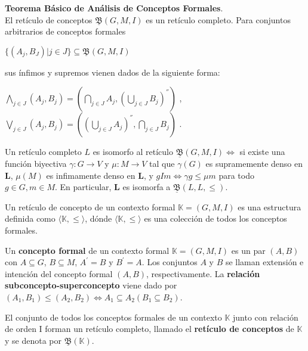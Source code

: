 \documentclass[../../main.tex]{subfiles}
\begin{document}
\begin{teorema}
\textbf{Teorema Básico de Análisis de Conceptos Formales}. \\
El retículo de conceptos $\underline{\mathfrak{B}}(G, M, I)$ es un retículo completo. Para conjuntos arbitrarios de conceptos formales
\begin{center}
    $\{ (A_j, B_J) | j \in J \} \subseteq \underline{\mathfrak{B}}(G, M, I)$ \\
\end{center}
sus ínfimos y supremos vienen dados de la siguiente forma:
\begin{center}

    $\underset{j \in J}{\bigwedge} (A_j, B_j) = (\underset{j \in J}{\bigcap} A_j, (\underset{j \in J}{\bigcup} B_j)^{''}) $ , \\
    $\underset{j \in J}{\bigvee} (A_j, B_j) = ((\underset{j \in J}{\bigcup} A_j)^{''}, \underset{j \in J}{\bigcap} B_j) $ . \\
\end{center}
Un retículo completo $L$ es isomorfo al retículo $\underline{\mathfrak{B}}(G, M, I) \Longleftrightarrow$ si existe una función biyectiva $\gamma : G \rightarrow V$ y $\mu : M \rightarrow V$ tal que $\gamma(G)$ es supramemente denso en $\textbf{L}$, $\mu(M)$ es infimamente denso en $\textbf{L}$, y $gIm \Longleftrightarrow \gamma g \leq \mu m$ para todo $g \in G, m \in M$. En particular, $\textbf{L}$ es isomorfa a $\underline{\mathfrak{B}}(L, L, \leq)$.
\end{teorema}



\begin{definicion}
Un retículo de concepto de un contexto formal $\mathbb{K} = (G, M, I)$ es una estructura definida como $\langle \mathbb{K}, \leq \rangle$, dónde $\langle \mathbb{K}, \leq \rangle$ es una colección de todos los conceptos formales.
\end{definicion}

\begin{definicion}
Un \textbf{concepto formal} de un contexto formal $\mathbb{K} = (G, M, I)$ es un par $(A, B)$ con $A \subseteq G$, $B \subseteq M$, $A^{'} = B$ y $B^{'} = A$. Los conjuntos $A$ y $B$ se llaman extensión e intención del concepto formal $(A,B)$, respectivamente. La \textbf{relación subconcepto-superconcepto} viene dado por $(A_1, B_1) \leq (A_2, B_2) \Longleftrightarrow A_1 \subseteq A_2 (B_1 \subseteq B_2)$.
\end{definicion}


\begin{definicion}
El conjunto de todos los conceptos formales de un contexto $\mathbb{K}$ junto con relación de orden I forman un retículo completo, llamado el \textbf{retículo de conceptos} de $\mathbb{K}$ y se denota por $\underline{\mathfrak{B}}(\mathbb{K})$.
\end{definicion}
\end{document}
